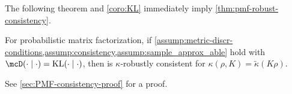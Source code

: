 
The following theorem and \cref{coro:KL} immediately imply \cref{thm:pmf-robust-consistency}. 
\begin{theorem} \label{thm:main-pmf}
	For probabilistic matrix factorization, if \cref{assump:metric-discr-conditions,assump:consistency,assump:sample_approx_able} hold with $\discr{\cdot}{\cdot} = \kl{\cdot}{\cdot}$, then 
    \methodname is $\kappa$-robustly consistent for $\kappa(\rho, K) = \widetilde{\kappa}(K \rho)$. 
\end{theorem}
See \cref{sec:PMF-consistency-proof} for a proof. 

